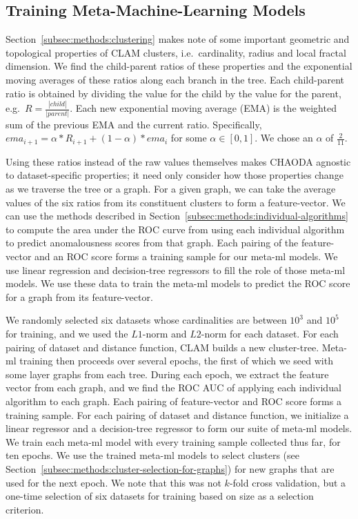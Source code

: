 \subsection{Training Meta-Machine-Learning Models}
\label{subsec:methods:training-meta-ml-models}

Section~\ref{subsec:methods:clustering} makes note of some important geometric and topological properties of CLAM clusters, i.e.\ cardinality, radius and local fractal dimension.
We find the child-parent ratios of these properties and the exponential moving averages of these ratios along each branch in the tree.
Each child-parent ratio is obtained by dividing the value for the child by the value for the parent, e.g.\ $R= \frac{|child|}{|parent|}$.
Each new exponential moving average (EMA) is the weighted sum of the previous EMA and the current ratio.
Specifically, $ema_{i+1} = \alpha * R_{i + 1} + (1 - \alpha) * ema_i$ for some $\alpha \in [0, 1]$.
We chose an $\alpha$ of $\frac{2}{11}$.

Using these ratios instead of the raw values themselves makes CHAODA agnostic to dataset-specific properties; it need only consider how those properties change as we traverse the tree or a graph.
For a given graph, we can take the average values of the six ratios from its constituent clusters to form a feature-vector.
We can use the methods described in Section~\ref{subsec:methods:individual-algorithms} to compute the area under the ROC curve from using each individual algorithm to predict anomalousness scores from that graph.
Each pairing of the feature-vector and an ROC score forms a training sample for our meta-ml models.
We use linear regression and decision-tree regressors to fill the role of those meta-ml models.
We use these data to train the meta-ml models to predict the ROC score for a graph from its feature-vector.

We randomly selected six datasets whose cardinalities are between $10^3$ and $10^5$ for training, and we used the $L1$-norm and $L2$-norm for each dataset.
For each pairing of dataset and distance function, CLAM builds a new cluster-tree.
Meta-ml training then proceeds over several epochs, the first of which we seed with some layer graphs from each tree.
During each epoch, we extract the feature vector from each graph, and we find the ROC AUC of applying each individual algorithm to each graph.
Each pairing of feature-vector and ROC score forms a training sample.
For each pairing of dataset and distance function, we initialize a linear regressor and a decision-tree regressor to form our suite of meta-ml models.
We train each meta-ml model with every training sample collected thus far, for ten epochs.
We use the trained meta-ml models to select clusters (see Section~\ref{subsec:methods:cluster-selection-for-graphs}) for new graphs that are used for the next epoch.
We note that this was not $k$-fold cross validation, but a one-time selection of six datasets for training based on size as a selection criterion.

